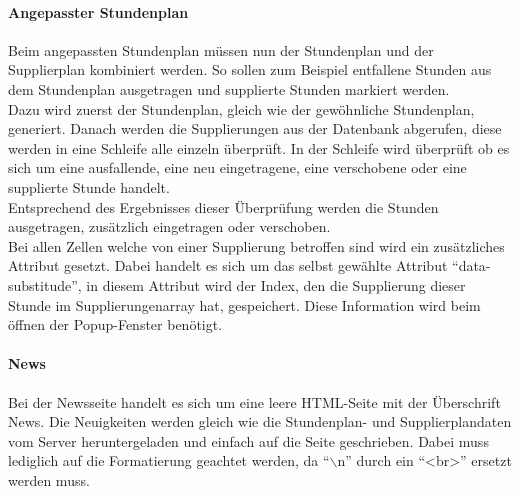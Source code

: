 \paragraph{Angepasster Stundenplan\\}
Beim angepassten Stundenplan müssen nun der Stundenplan und der Supplierplan kombiniert werden. So sollen zum Beispiel entfallene Stunden aus dem Stundenplan ausgetragen und supplierte Stunden markiert werden.\\
Dazu wird zuerst der Stundenplan, gleich wie der gewöhnliche Stundenplan, generiert. Danach werden die Supplierungen aus der Datenbank abgerufen, diese werden in eine Schleife alle einzeln überprüft. In der Schleife wird überprüft ob es sich um eine ausfallende, eine neu eingetragene, eine verschobene oder eine supplierte Stunde handelt.\\ Entsprechend des Ergebnisses dieser Überprüfung werden die Stunden ausgetragen, zusätzlich eingetragen oder verschoben.\\
Bei allen Zellen welche von einer Supplierung betroffen sind wird ein zusätzliches Attribut gesetzt. Dabei handelt es sich um das selbst gewählte Attribut \enquote{data-substitude}, in diesem Attribut wird der Index, den die Supplierung dieser Stunde im Supplierungenarray hat, gespeichert. Diese Information wird beim öffnen der Popup-Fenster benötigt.\\

\paragraph{News\\}
Bei der Newsseite handelt es sich um eine leere HTML-Seite mit der Überschrift News. Die Neuigkeiten werden gleich wie die Stundenplan- und Supplierplandaten vom Server heruntergeladen und einfach auf die Seite geschrieben. Dabei muss lediglich auf die Formatierung geachtet werden, da \enquote{$\backslash$n} durch ein \enquote{<br>} ersetzt werden muss.\\


